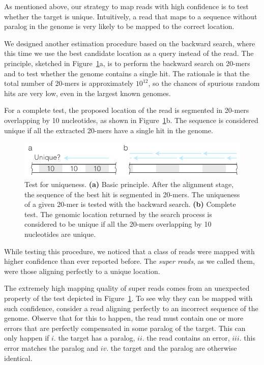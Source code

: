 \documentclass[a4,center,fleqn]{NAR}
\begin{document}
As mentioned above, our strategy to map reads with high confidence is to
test whether the target is unique. Intuitively, a read that maps to a
sequence without paralog in the genome is very likely to be mapped to the
correct location.

We designed another estimation procedure based on the backward search,
where this time we use the best candidate location as a query instead of
the read. The principle, sketched in Figure~\ref{fig_supertest}a, is to
perform the backward search on 20-mers and to test whether the genome
contains a single hit. The rationale is that the total number of 20-mers
is approximately $10^{12}$, so the chances of spurious random hits are
very low, even in the largest known genomes.

For a complete test, the proposed location of the read is segmented in
20-mers overlapping by 10 nucleotides, as shown in
Figure~\ref{fig_supertest}b. The sequence is considered unique if all the
extracted 20-mers have a single hit in the genome.

\begin{figure}[t]
\begin{center}
\includegraphics[scale=.75]{supertest.pdf}
\end{center}
\caption{Test for uniqueness. \textbf{(a)} Basic principle. After the
alignment stage, the sequence of the best hit is segmented in 20-mers. The
uniqueness of a given 20-mer is tested with the backward search.
\textbf{(b)} Complete test. The genomic location returned by the search
process is considered to be unique if all the 20-mers overlapping by 10
nucleotides are unique.}
\label{fig_supertest}
\end{figure}

While testing this procedure, we noticed that a class of reads were mapped
with higher confidence than ever reported before. The \emph{super reads},
as we called them, were those aligning perfectly to a unique location.

The extremely high mapping quality of super reads comes from an unexpected
property of the test depicted in Figure~\ref{fig_supertest}. To see why
they can be mapped with such confidence, consider a read aligning
perfectly to an incorrect sequence of the genome. Observe that for
this to happen, the read must contain one or more errors that are perfectly
compensated in some paralog of the target. This can only happen if $i.$
the target has a paralog, $ii.$ the read contains an error, $iii.$ this
error matches the paralog and $iv.$ the target and the paralog are
otherwise identical.
\end{document}
